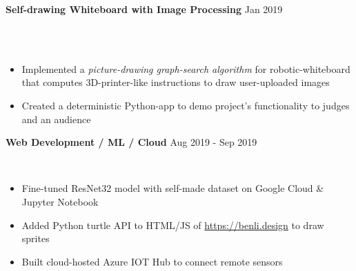 \documentclass[a4paper]{article}
\begin{document}
{\textbf{Self-drawing Whiteboard with Image Processing} \hfill Jan 2019\\\\
\vspace{-2mm}
	\item[]
	\\
\vspace{-1mm}
\begin{itemize} \itemsep 0.5pt
	\item Implemented a \textit{picture-drawing graph-search algorithm} for robotic-whiteboard that computes 3D-printer-like instructions to draw user-uploaded images
    \item Created a deterministic Python-app to demo project’s functionality to judges and an audience
\end{itemize}
\vspace*{2mm}

\textbf{Web Development / ML / Cloud} \hfill Aug 2019 - Sep 2019\\
\vspace{-2mm}
	\item[]
	\\
\vspace{-1mm}
\begin{itemize} \itemsep 0.5pt
	\item Fine-tuned ResNet32 model with self-made dataset on Google Cloud \& Jupyter Notebook
	\item Added Python turtle API to HTML/JS of \url{https://benli.design} to draw sprites
	\item Built cloud-hosted Azure IOT Hub to connect remote sensors
\end{itemize}
\vspace*{2mm}

}
\end{document}
